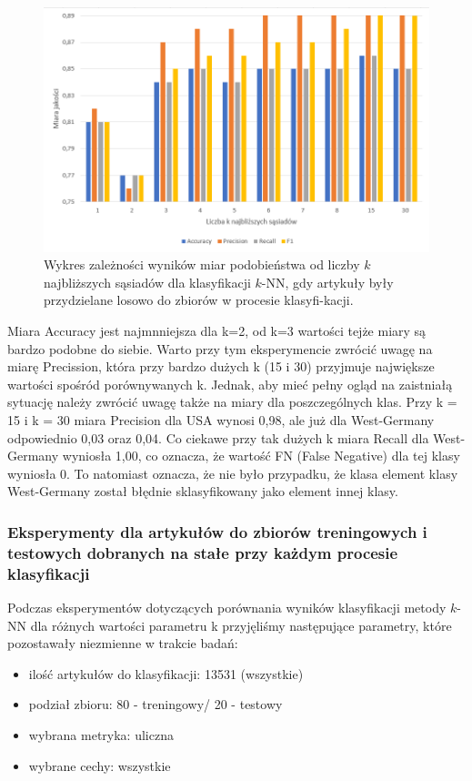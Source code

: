\documentclass{classrep}
\begin{document}
\begin{figure}[H]
    \centering
    \includegraphics[width=14cm]{wykres_k.png}
    \caption{Wykres zależności wyników miar podobieństwa od liczby $k$ najbliższych sąsiadów dla klasyfikacji $k$-NN, gdy artykuły były przydzielane losowo do zbiorów w procesie klasyfi-kacji.}
    \label{wykres:k}
\end{figure}

Miara Accuracy jest najmnniejsza dla k=2, od k=3 wartości tejże miary są bardzo podobne do siebie. Warto przy tym eksperymencie zwrócić uwagę na miarę Precission, która przy bardzo dużych k (15 i 30) przyjmuje największe wartości spośród porównywanych k. Jednak, aby mieć pełny ogląd na zaistniałą sytuację należy zwrócić uwagę także na miary dla poszczególnych klas. Przy k = 15 i k = 30 miara Precision dla USA wynosi 0,98, ale już dla West-Germany odpowiednio 0,03 oraz 0,04. Co ciekawe przy tak dużych k miara Recall dla West-Germany wyniosła 1,00, co oznacza, że wartość FN (False Negative) dla tej klasy wyniosła 0. To natomiast oznacza, że nie było przypadku, że klasa element klasy West-Germany został błędnie sklasyfikowany jako element innej klasy.

\subsubsection{ Eksperymenty dla artykułów do zbiorów treningowych i testowych dobranych na stałe przy każdym procesie klasyfikacji}

Podczas eksperymentów dotyczących porównania wyników klasyfikacji metody $k$-NN dla różnych wartości parametru k przyjęliśmy następujące parametry, które pozostawały niezmienne w trakcie badań:
\begin{itemize}
    \item ilość artykułów do klasyfikacji: 13531 (wszystkie)
    \item podział zbioru: 80 - treningowy/ 20 - testowy
    \item wybrana metryka: uliczna
    \item wybrane cechy: wszystkie
\end{itemize}
\end{document}
